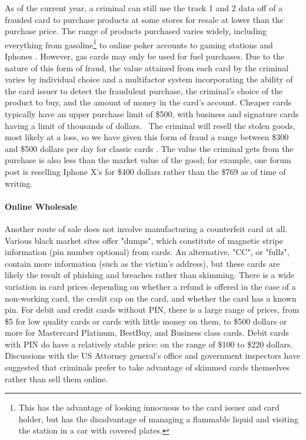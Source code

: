 As of the current year, a criminal can still use the track 1 and 2 data off of a frauded card to purchase products at
some stores for resale at lower than the purchase price. \cite{cardingGeneralGuide, howToSucceedInStore}
%
The range of products purchased varies widely, including everything from gasoline\footnote{This has the advantage of
looking innocuous to the card issuer and card holder, but has the disadvantage of managing a flammable liquid and
visiting the station in a car with covered plates.} \cite{krebsbladder} to online poker
accounts \cite{cardingPokerstars} to gaming stations and Iphones \cite{cardingBuyStuff}.
%
However, gas cards may only be used for fuel purchases.
%
Due to the nature of this form of fraud, the value attained from each card by the criminal varies by individual choice
and a multifactor system incorporating the ability of the card issuer to detect the fraudulent purchase, the criminal's
choice of the product to buy, and the amount of money in the card's account. \cite{viceInterviewWithCarder}
%
Cheaper cards typically have an upper purchase limit of \$500, with business and signature cards having a limit of
thousands of dollars.~\cite{cardingGeneralGuide}
%
The criminal will resell the stolen goods, most likely at a loss, so we have given this form of fraud a range
between \$300 and \$500 dollars per day for classic cards \cite{cardingNewbieGuide, viceInterviewWithCarder}.
%
The value the criminal gets from the purchase is also less than the market value of the good; for example, one forum
post is reselling Iphone X's for \$400 dollars rather than the \$769 as of time of writing. \cite{iphoneXSale}

\paragraph{Online Wholesale}

Another route of sale does not involve manufacturing a counterfeit card at all.
%
Various black market sites offer "dumps", which constitute of magnetic stripe information (pin number optional)
from cards. \cite{meccadumps,legitshop, sellcvv,dumpsto, dumpsPrtShip}
%
An alternative, "CC", or "fullz", contain more information (such as the victim's address), but these cards are likely
the result of phishing and breaches rather than skimming.
%
There is a wide variation in card prices depending on whether a refund is offered in the case of a non-working card,
the credit cap on the card, and whether the card has a known pin.
%
For debit and credit cards without PIN, there is a large range of prices, from \$5 for low quality cards or cards with
little money on them, to \$500 dollars or more for Mastercard Platinum, BestBuy, and Business class
cards. \cite{meccadumps, dumpsto, dumpsPrtShip, mrwhite}
%
Debit cards with PIN do have a relatively stable price: on the range of \$100 to \$220 dollars. \cite{sellcvv, legitshop}
%
Discussions with the US Attorney general's office and government inspectors have suggested that criminals
prefer to take advantage of skimmed cards themselves rather than sell them online.


